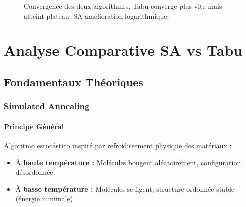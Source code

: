 \documentclass[12pt,a4paper,twoside]{report}
\begin{document}
\begin{figure}[H]
    \centering
    \caption{Convergence des deux algorithmes. Tabu converge plus vite mais atteint plateau. SA amélioration logarithmique.}
\end{figure}

\chapter{Analyse Comparative SA vs Tabu}

\section{Fondamentaux Théoriques}

\subsection{Simulated Annealing}

\subsubsection{Principe Général}

Algoritmo estocástico inspiré par refroidissement physique des matériaux :

\begin{itemize}
    \item À \textbf{haute température :} Molécules bougent aléatoirement, configuration désordonnée
    \item À \textbf{basse température :} Molécules se figent, structure ordonnée stable (énergie minimale)
\end{itemize}
\end{document}
